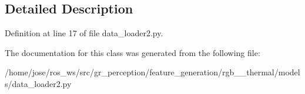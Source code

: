 \subsection{Detailed Description}


Definition at line 17 of file data\+\_\+loader2.\+py.



The documentation for this class was generated from the following file\+:\begin{DoxyCompactItemize}
\item 
/home/jose/ros\+\_\+ws/src/gr\+\_\+perception/feature\+\_\+generation/rgb\+\_\+\_\+thermal/models/data\+\_\+loader2.\+py\end{DoxyCompactItemize}
